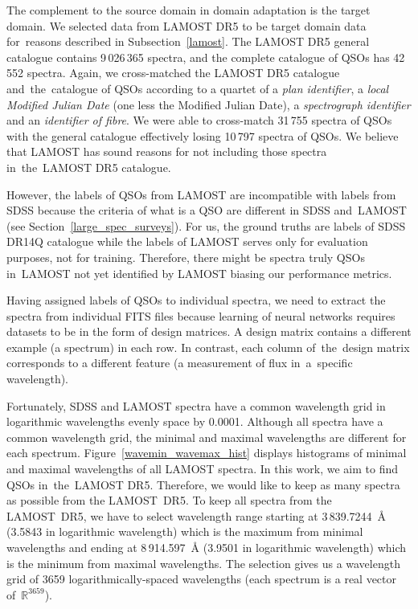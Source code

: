 The complement to the source domain in domain adaptation is the target domain.
We selected data from LAMOST DR5 to be target domain data
for~reasons described in Subsection~\ref{lamost}.
The LAMOST DR5 general catalogue contains 9\,026\,365 spectra,
and the complete catalogue of QSOs has 42\,552 spectra.
Again, we cross-matched the LAMOST DR5 catalogue and~the~catalogue of QSOs
according to a quartet of a \textit{plan identifier}, a \textit{local Modified Julian Date} (one less the Modified Julian Date), a \textit{spectrograph identifier} and an \textit{identifier of fibre}.
We were able to cross-match 31\,755 spectra of QSOs with the general catalogue
effectively losing 10\,797 spectra of QSOs.
We believe that LAMOST has sound reasons for not including those spectra in~the~LAMOST DR5 catalogue.

However, the labels of QSOs from LAMOST are incompatible with labels from SDSS
because the criteria of what is a QSO are different in SDSS and~LAMOST
(see Section~\ref{large_spec_surveys}).
For us, the ground truths are labels of SDSS DR14Q catalogue
while the labels of LAMOST serves only for evaluation purposes,
not for training.
Therefore, there might be spectra truly QSOs in~LAMOST
not yet identified by LAMOST biasing our performance metrics.

Having assigned labels of QSOs to individual spectra,
we need to extract the spectra from individual FITS files
because learning of neural networks requires datasets to be in the form of design matrices.
A design matrix contains a different example (a spectrum) in each row.
In contrast, each column of~the~design matrix corresponds to a different feature
(a measurement of flux in~a~specific wavelength).~\cite{goodfellow2016}

Fortunately, SDSS and LAMOST spectra have a common wavelength grid in logarithmic wavelengths evenly space by 0.0001.
Although all spectra have a common wavelength grid,
the minimal and maximal wavelengths are different for each spectrum.
Figure~\ref{wavemin_wavemax_hist} displays histograms of minimal and maximal wavelengths of all LAMOST spectra.
In this work, we aim to find QSOs in~the~LAMOST DR5.
Therefore, we would like to keep as many spectra as possible from the LAMOST~DR5.
To keep all spectra from the LAMOST~DR5,
we have to select wavelength range starting at 3\,839.7244~\AA{} (3.5843 in logarithmic wavelength)
which is the maximum from minimal wavelengths
and ending at 8\,914.597~\AA{} (3.9501 in logarithmic wavelength)
which is the minimum from maximal wavelengths.
The selection gives us a wavelength grid of 3659 logarithmically-spaced wavelengths
(each spectrum is a real vector of~\(\mathbb{R}^{3659}\)).

